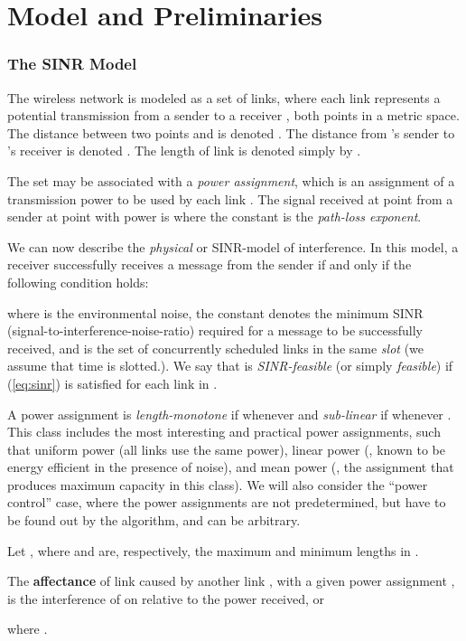 \documentclass[11pt]{amsart}
\begin{document}
\section{Model and Preliminaries}
\label{sec:model}
\subsubsection*{The SINR Model}
The wireless network is modeled as a set  of  links, where
each link  represents a potential transmission from a sender
 to a receiver , both points in a metric space. 
The distance between two points  and  is denoted .  
The distance from
's sender to 's receiver is denoted .
The length of link  is denoted 
simply by .

The set may be associated with a \emph{power assignment}, which is an assignment of a transmission
power  to be used by each link .
The signal received at point
 from a sender at point  with power   is  where the constant 
 is the \emph{path-loss exponent}. 

We can now describe the  \emph{physical} or SINR-model of interference. In this model, a receiver 
successfully receives a message from the sender  if and only if the
following condition holds:

where  is the environmental noise, the constant  denotes the minimum
SINR (signal-to-interference-noise-ratio) required for a message to be successfully received,
and  is the set of concurrently scheduled links in the same \emph{slot} (we assume that time is slotted.).
We say that  is \emph{SINR-feasible} (or simply \emph{feasible}) if (\ref{eq:sinr}) is
satisfied for each link in .

A power assignment  is \emph{length-monotone} if 
whenever  and \emph{sub-linear} if
 whenever
. This class includes the most interesting and
practical power assignments, such that uniform power (all links use
the same power), linear power (, known to be
energy efficient in the presence of noise), and mean power (, the assignment that produces maximum capacity in
this class). We will also consider the ``power control'' case, where
the power assignments are not predetermined, but have to be found out
by the algorithm, and can be arbitrary.

Let , where  and  are, respectively, the maximum and minimum lengths in .

\begin{defn}
The \textbf{affectance}  of link  caused by another link ,
with a given power assignment ,
is the interference of  on  relative to the power
received, or
   
where . 
\end{defn}
\end{document}
